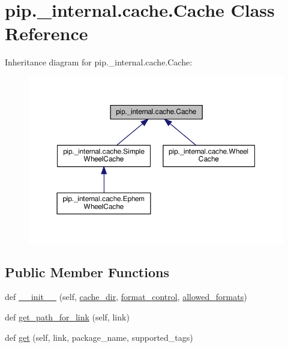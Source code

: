 \hypertarget{classpip_1_1__internal_1_1cache_1_1Cache}{}\section{pip.\+\_\+internal.\+cache.\+Cache Class Reference}
\label{classpip_1_1__internal_1_1cache_1_1Cache}


Inheritance diagram for pip.\+\_\+internal.\+cache.\+Cache\+:
\nopagebreak
\begin{figure}[H]
\begin{center}
\leavevmode
\includegraphics[width=350pt]{classpip_1_1__internal_1_1cache_1_1Cache__inherit__graph}
\end{center}
\end{figure}
\subsection*{Public Member Functions}
\begin{DoxyCompactItemize}
\item 
def \hyperlink{classpip_1_1__internal_1_1cache_1_1Cache_a4b7761f49e02faa5e273b43eb21742f4}{\+\_\+\+\_\+init\+\_\+\+\_\+} (self, \hyperlink{classpip_1_1__internal_1_1cache_1_1Cache_aed8f0121963b4d3095aaa0b2ea344012}{cache\+\_\+dir}, \hyperlink{classpip_1_1__internal_1_1cache_1_1Cache_ac6051e5c3dff9ba7c7e5968e82acc9d2}{format\+\_\+control}, \hyperlink{classpip_1_1__internal_1_1cache_1_1Cache_a367ac1a183aca35d140712d557adb388}{allowed\+\_\+formats})
\item 
def \hyperlink{classpip_1_1__internal_1_1cache_1_1Cache_a95a2a7b3fd47f18987558738366660fe}{get\+\_\+path\+\_\+for\+\_\+link} (self, link)
\item 
def \hyperlink{classpip_1_1__internal_1_1cache_1_1Cache_ad68488daa2dd21db48b7c82b72d35e32}{get} (self, link, package\+\_\+name, supported\+\_\+tags)
\end{DoxyCompactItemize}
